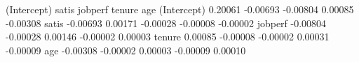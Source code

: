 \begin{Schunk}
\begin{Soutput}
            (Intercept)    satis  jobperf   tenure      age
(Intercept)     0.20061 -0.00693 -0.00804  0.00085 -0.00308
satis          -0.00693  0.00171 -0.00028 -0.00008 -0.00002
jobperf        -0.00804 -0.00028  0.00146 -0.00002  0.00003
tenure          0.00085 -0.00008 -0.00002  0.00031 -0.00009
age            -0.00308 -0.00002  0.00003 -0.00009  0.00010
\end{Soutput}
\end{Schunk}
